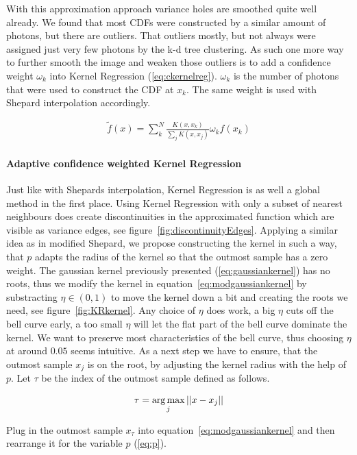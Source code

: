With this approximation approach variance holes are smoothed quite well already. We found that most CDFs were constructed by a similar amount of photons, but there are outliers. That outliers mostly, but not always were assigned just very few photons by the k-d tree clustering. As such one more way to further smooth the image and weaken those outliers is to add a confidence weight $\omega_k$ into Kernel Regression (\ref{eq:ckernelreg}). $\omega_k$ is the number of photons that were used to construct the CDF at $x_k$. The same weight is used with Shepard interpolation accordingly.

\begin{align}\label{eq:ckernelreg}
\widetilde{f}(x) = \sum_{k}^{N}\frac{K(x,x_k)}{\sum\nolimits_{j}K(x, x_j)}\omega_kf(x_k)
\end{align}

\paragraph{Adaptive confidence weighted Kernel Regression}
Just like with Shepards interpolation, Kernel Regression is as well a global method in the first place. Using Kernel Regression with only a subset of nearest neighbours does create discontinuities in the approximated function which are visible as variance edges, see figure~\ref{fig:discontinuityEdges}. Applying a similar idea as in modified Shepard, we propose constructing the kernel in such a way, that $p$ adapts the radius of the kernel so that the outmost sample has a zero weight. The gaussian kernel previously presented (\ref{eq:gaussiankernel}) has no roots, thus we modify the kernel in equation~\ref{eq:modgaussiankernel} by substracting $\eta \in (0,1)$ to move the kernel down a bit and creating the roots we need, see figure~\ref{fig:KRkernel}. Any choice of $\eta$ does work, a big $\eta$ cuts off the bell curve early, a too small $\eta$ will let the flat part of the bell curve dominate the kernel. We want to preserve most characteristics of the bell curve, thus choosing $\eta$ at around $0.05$ seems intuitive.  As a next step we have to ensure, that the outmost sample $x_j$ is on the root, by adjusting the kernel radius with the help of $p$. Let $\tau$ be the index of the outmost sample defined as follows. 

\begin{align}
\label{eq:tau}
\tau = \operatorname*{arg\,max}_j ||x - x_j||
\end{align}

Plug in the outmost sample $x_\tau$ into equation~\ref{eq:modgaussiankernel} and then rearrange it for the variable $p$ (\ref{eq:p}). 

